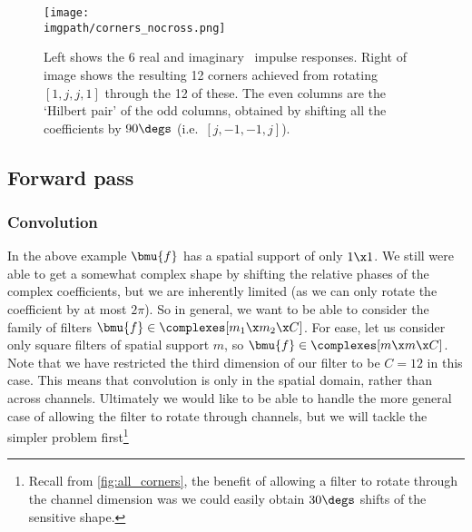   \begin{figure}[!h]
    \centering
    \texttt{[image: \\imgpath/corners\_nocross.png]}
    \caption{Left shows the 6 real and imaginary \DTCWT\ impulse responses.
    Right of image shows the resulting 12 corners achieved from rotating
    $\left[1, j, j, 1\right]$ through the 12 of these. The even columns are the
    `Hilbert pair' of the odd columns, obtained by shifting all the
    coefficients by $90\degs$ (i.e.\ $\left[j,-1,-1,j\right]$).}
    \label{fig:all_corners}
  \end{figure}
  
\subsection*{Forward pass}
\subsubsection*{Convolution}
  \renewcommand{\SigIn}{\ensuremath{z}\xspace}
  \renewcommand{\SigOut}{\ensuremath{w}\xspace}
  \renewcommand{\Filter}{\ensuremath{f}\xspace}
  \renewcommand{\SigInB}{\ensuremath{\bmu{\SigIn}}\xspace}
  \renewcommand{\SigOutB}{\ensuremath{\bmu{\SigOut}}\xspace}
  \renewcommand{\FilterB}{\ensuremath{\bmu{\Filter}}\xspace}
  
  In the above example \FilterB has a spatial support of only $1\x 1$. We still
  were able to get a somewhat complex shape by shifting the relative phases of
  the complex coefficients, but we are inherently limited (as we can only
  rotate the coefficient by at most $2\pi$). So in general, we want to be able
  to consider the family of filters $\FilterB \in \complexes[m_1 \x m_2 \x C]$. For
  ease, let us consider only square filters of spatial support $m$, so
  $\FilterB \in \complexes[m\x m\x C]$. Note that we have restricted the third
  dimension of our filter to be $C=12$ in this case. This means that convolution is
  only in the spatial domain, rather than across channels. Ultimately we would
  like to be able to handle the more general case of allowing the filter to
  rotate through channels, but we will tackle the simpler problem 
  first\footnote{Recall from \autoref{fig:all_corners}, the benefit of allowing
  a filter to rotate through the channel dimension was we could easily obtain
  $30\degs$ shifts of the sensitive shape.}

